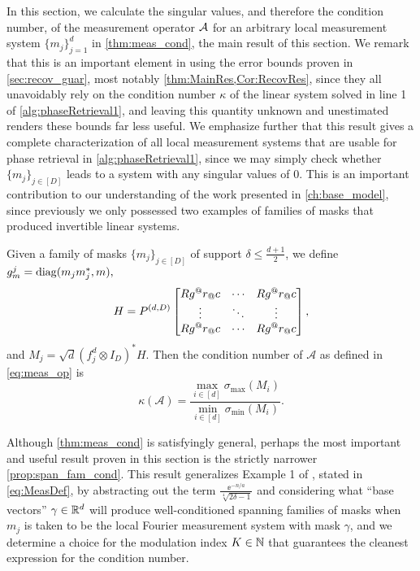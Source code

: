 In this section, we calculate the singular values, and therefore the condition number, of the measurement operator $\mathcal{A}$ for an arbitrary local measurement system $\{m_j\}_{j = 1}^d$ in \cref{thm:meas_cond}, the main result of this section.  We remark that this is an important element in using the error bounds proven in \cref{sec:recov_guar}, most notably \cref{thm:MainRes,Cor:RecovRes}, since they all unavoidably rely on the condition number $\kappa$ of the linear system solved in line 1 of \cref{alg:phaseRetrieval1}, and leaving this quantity unknown and unestimated renders these bounds far less useful.  We emphasize further that this result gives a complete characterization of all local measurement systems that are usable for phase retrieval in \cref{alg:phaseRetrieval1}, since we may simply check whether $\{m_j\}_{j \in [D]}$ leads to a system with any singular values of $0$.  This is an important contribution to our understanding of the work presented in \cref{ch:base_model}, since previously we only possessed two examples of families of masks that produced invertible linear systems.

\begin{theorem}
  Given a family of masks $\{m_j\}_{j \in [D]}$ of support $\delta \le \frac{d + 1}{2}$, we define $g_m^j = \operatorname{diag}(m_j m_j^*, m),$ \[H = P^{(d, D)} \cornmatfun{R g^@r_@c}{1}{D}{1 - \delta}{\delta - 1}%
  ,\] and $M_j = \sqrt{d}\left(f_j^d \otimes I_D\right)^* H$.  Then the condition number of $\mathcal{A}$ as defined in \eqref{eq:meas_op} is \[\kappa(\mathcal{A}) = \dfrac{\max\limits_{i \in [d]} \sigma_{\max} (M_i)}{\min\limits_{i \in [d]} \sigma_{\min} (M_i)}.\] \label{prop:meas_cond} \label{thm:meas_cond}
\end{theorem}

Although \cref{thm:meas_cond} is satisfyingly general, perhaps the most important and useful result proven in this section is the strictly narrower \cref{prop:span_fam_cond}.  This result generalizes Example 1 of , stated in \eqref{eq:MeasDef}, by abstracting out the term $\frac{\ee^{-n/a}}{\sqrt[4]{2\delta -1}}$ and considering what ``base vectors'' $\gamma \in \mathbb{R}^d$ will produce well-conditioned spanning families of masks when $m_j$ is taken to be the local Fourier measurement system with mask $\gamma$, and we determine a choice for the modulation index $K \in \mathbb{N}$ that guarantees the cleanest expression for the condition number.  

